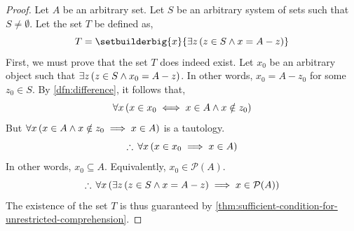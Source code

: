 \begin{proof}
    Let \( A \) be an arbitrary set. Let \( S \) be an arbitrary system of sets such that \( S \neq \emptyset \).
    Let the set \( T \) be defined as,
    \begin{equation}
        \label{eq:T-in-set-builder-notation}
        T = \setbuilderbig{x}{\exists z \, \mleft( z \in S \land x = A - z \mright)}
    \end{equation}
    First, we must prove that the set \( T \) does indeed exist. Let \( x_{0} \) be an arbitrary object such that
    \( \exists z \, \mleft( z \in S \land x_{0} = A - z \mright) \). In other words, \( x_{0} = A - z_{0} \) for
    some \( z_{0} \in S \). By \cref{dfn:difference}, it follows that,
    \begin{equation*}
        \forall x \, \mleft( x \in x_{0} \iff x \in A \land x \notin z_{0} \mright)
    \end{equation*}
    But \( \forall x \, \mleft( x \in A \land x \notin z_{0} \implies x \in A \mright) \) is a tautology.
    \begin{equation*}
        \therefore \, \forall x \, \mleft( x \in x_{0} \implies x \in A \mright)
    \end{equation*}
    In other words, \( x_{0} \subseteq A \). Equivalently, \( x_{0} \in \mathcal{P}(A) \).
    \begin{equation*}
        \therefore \, \forall x \, \mleft( \exists z \, \mleft( z \in S \land x = A - z \mright) \implies x \in \mathcal{P}(A) \mright)
    \end{equation*}
    The existence of the set \( T \) is thus guaranteed by \cref{thm:sufficient-condition-for-unrestricted-comprehension}.


\end{proof}
